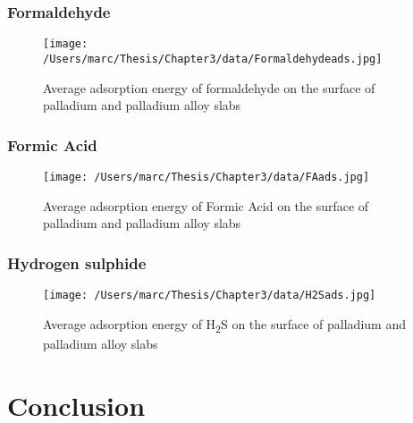 \subsubsection{Formaldehyde}
\begin{landscape}
  \begin{figure}
      \centering
      \texttt{[image: /Users/marc/Thesis/Chapter3/data/Formaldehydeads.jpg]}
      \caption{Average adsorption energy of formaldehyde on the surface of palladium and palladium alloy slabs}
      \label{formaldehydeads}
    \end{figure}
  
  \end{landscape}

\subsubsection{Formic Acid}

\begin{landscape}
  \begin{figure}
      \centering
      \texttt{[image: /Users/marc/Thesis/Chapter3/data/FAads.jpg]}
      \caption{Average adsorption energy of Formic Acid on the surface of palladium and palladium alloy slabs}
      \label{FAads}
    \end{figure}
  
  \end{landscape}
\subsubsection{Hydrogen sulphide}
\begin{landscape}

\begin{figure}
    \centering
    \texttt{[image: /Users/marc/Thesis/Chapter3/data/H2Sads.jpg]}
    \caption{Average adsorption energy of H\textsubscript{2}S on the surface of palladium and palladium alloy slabs}
    \label{h2sads}
  \end{figure}
\end{landscape}


\section{Conclusion}

